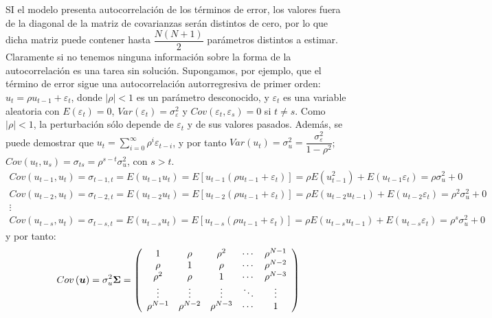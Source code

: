 SI el modelo presenta autocorrelaci\'on de los t\'erminos de error, los
valores fuera de la diagonal de la matriz de covarianzas ser\'an distintos
de cero, por lo que dicha matriz puede contener hasta $\dfrac{N\left(N+1\right)}{2}$
par\'ametros distintos a estimar. Claramente si no tenemos ninguna informaci\'on
sobre la forma de la autocorrelaci\'on es una tarea sin soluci\'on. Supongamos,
por ejemplo, que el t\'ermino de error sigue una autocorrelaci\'on autorregresiva
de primer orden: $u_{t}=\rho u_{t-1}+\varepsilon_{t}$, donde $\left|\rho\right|<1$
es un par\'ametro desconocido, y $\varepsilon_{t}$ es una variable
aleatoria con $E\left(\varepsilon_{t}\right)=0$, $Var\left(\varepsilon_{t}\right)=\sigma_{\varepsilon}^{2}$
y $Cov\left(\varepsilon_{t},\varepsilon_{s}\right)=0$ si $t\neq s$.
Como $\left|\rho\right|<1$, la perturbaci\'on s\'olo depende de $\varepsilon_{t}$
y de sus valores pasados. Adem\'as, se puede demostrar que $u_{t}=\sum_{i=0}^{\infty}\rho^{i}\varepsilon_{t-i}$,
y por tanto $Var\left(u_{t}\right)=\sigma_{u}^{2}=\dfrac{\sigma_{\varepsilon}^{2}}{1-\rho^{2}}$;
$Cov\left(u_{t},u_{s}\right)=\sigma_{ts}=\rho^{s-t}\sigma_{u}^{2}$,
con $s>t$. 
\[
\begin{array}{c}
Cov\left(u_{t-1},u_{t}\right)=\sigma_{t-1,t}=E\left(u_{t-1}u_{t}\right)=E\left[u_{t-1}\left(\rho u_{t-1}+\varepsilon_{t}\right)\right]=\rho E\left(u_{t-1}^{2}\right)+E\left(u_{t-1}\varepsilon_{t}\right)=\rho\sigma_{u}^{2}+0\\
Cov\left(u_{t-2},u_{t}\right)=\sigma_{t-2,t}=E\left(u_{t-2}u_{t}\right)=E\left[u_{t-2}\left(\rho u_{t-1}+\varepsilon_{t}\right)\right]=\rho E\left(u_{t-2}u_{t-1}\right)+E\left(u_{t-2}\varepsilon_{t}\right)=\rho^{2}\sigma_{u}^{2}+0\\
\vdots\\
Cov\left(u_{t-s},u_{t}\right)=\sigma_{t-s,t}=E\left(u_{t-s}u_{t}\right)=E\left[u_{t-s}\left(\rho u_{t-1}+\varepsilon_{t}\right)\right]=\rho E\left(u_{t-s}u_{t-1}\right)+E\left(u_{t-s}\varepsilon_{t}\right)=\rho^{s}\sigma_{u}^{2}+0
\end{array}
\]
y por tanto: 
\[
Cov\left(\boldsymbol{u}\right)=\sigma_{u}^{2}\boldsymbol{\Sigma}=\left(\begin{array}{ccccc}
1 & \rho & \rho^{2} & \cdots & \rho^{N-1}\\
\rho & 1 & \text{\ensuremath{\rho}} & \cdots & \rho^{N-2}\\
\rho^{2} & \rho & 1 & \cdots & \rho^{N-3}\\
\vdots & \vdots & \vdots & \ddots & \vdots\\
\rho^{N-1} & \rho^{N-2} & \rho^{N-3} & \cdots & 1
\end{array}\right)
\]
